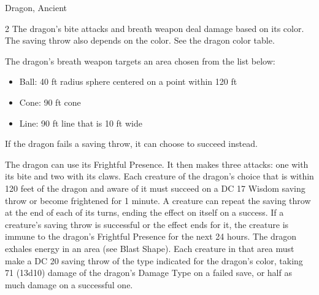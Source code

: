 \begin{DndMonster}[width=\textwidth + 8pt]{Dragon, Ancient}
\begin{multicols}{2}
 The dragon's bite attacks and breath weapon deal damage based on its color. The saving throw also depends on the color. See the dragon color table.

 The dragon's breath weapon targets an area chosen from the list below:
\begin{itemize}
	\item[]Ball: 40 ft radius sphere centered on a point within 120 ft
	\item[]Cone: 90 ft cone
	\item[]Line: 90 ft line that is 10 ft wide
\end{itemize}

 If the dragon fails a saving throw, it can choose to succeed instead.

 The dragon can use its Frightful Presence. It then makes three attacks: one with its bite and two with its claws.
\DndMonsterAttack[
	name=Bite,
	distance=melee,
	type=weapon,
	mod=+13,
	reach=15,
	dmg=\DndDice{2d10 + 8},
	dmg-type=piercing,
	extra={ plus 9 (2d8) damage of the dragon's Damage Type.}
]
\DndMonsterAttack[
	name=Claw,
	distance=melee,
	type=weapon,
	mod=+13,
	reach=10,
	dmg=\DndDice{2d6 + 8},
	dmg-type=slashing
]
\DndMonsterAttack[
	name=Tail,
	distance=melee,
	type=weapon,
	mod=+13,
	reach=20,
	dmg=\DndDice{2d8 + 8},
	dmg-type=bludgeoning
]
Each creature of the dragon's choice that is within 120 feet of the dragon and aware of it must succeed on a DC 17 Wisdom saving throw or become frightened for 1 minute. A creature can repeat the saving throw at the end of each of its turns, ending the effect on itself on a success. If a creature's saving throw is successful or the effect ends for it, the creature is immune to the dragon's Frightful Presence for the next 24 hours.
The dragon exhales energy in an area (see Blast Shape). Each creature in that area must make a DC 20 saving throw of the type indicated for the dragon's color, taking 71 (13d10) damage of the dragon's Damage Type on a failed save, or half as much damage on a successful one.


\end{multicols}
\end{DndMonster}
